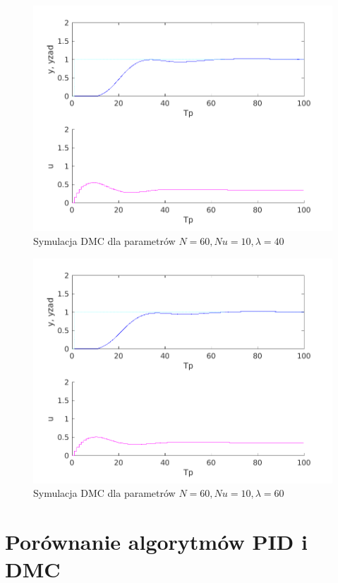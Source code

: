 \documentclass[a4paper, 10pt]{article}
\begin{document}
\begin{figure}
	\centering
	\includegraphics[width=0.7\linewidth]{z5_60_60_10_40.png}
	\caption{Symulacja DMC dla parametrów $N=60, Nu = 10, \lambda = 40$}
	\label{fig:z5_60_60_10_40}
\end{figure}
\begin{figure}
	\centering
	\includegraphics[width=0.7\linewidth]{z5_60_60_10_60.png}
	\caption{Symulacja DMC dla parametrów $N=60, Nu = 10, \lambda = 60$}
	\label{fig:z5_60_60_10_60}
\end{figure}
\section{Porównanie algorytmów PID i DMC}
\end{document}

